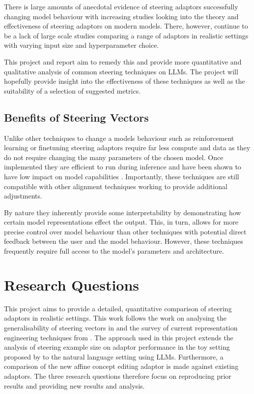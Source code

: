 There is large amounts of anecdotal evidence of steering adaptors successfully changing model behaviour with increasing studies looking into the theory \citep{steering-clear, steering-theory} and effectiveness \citep{steerability, steering-taxonomy} of steering adaptors on modern models.
There, however, continue to be a lack of large scale studies comparing a range of adaptors in realistic settings with varying input size and hyperparameter choice.

This project and report aim to remedy this and provide more quantitative and qualitative analysis of common steering techniques on LLMs.
The project will hopefully provide insight into the effectiveness of these techniques as well as the suitability of a selection of suggested metrics.

\subsection{Benefits of Steering Vectors}

Unlike other techniques to change a models behaviour such as reinforcement learning \citep{rl, rlhf} or finetuning \citep{lora} steering adaptors require far less compute and data as they do not require changing the many parameters of the chosen model.
Once implemented they are efficient to run during inference and have been shown to have low impact on model capabilities \citep{steering-wo-ss, sea}.
Importantly, these techniques are still compatible with other alignment techniques working to provide additional adjustments.

By nature they inherently provide some interpretability by demonstrating how certain model representations effect the output.
This, in turn, allows for more precise control over model behaviour than other techniques with potential direct feedback between the user and the model behaviour.
However, these techniques frequently require full access to the model's parameters and architecture.

\section{Research Questions}
\label{sec:questions}

This project aims to provide a detailed, quantitative comparison of steering adaptors in realistic settings.
This work follows the work on analysing the generalisability of steering vectors in \citet{steerability} and the survey of current representation engineering techniques from \citet{steering-taxonomy}.
The approach used in this project extends the analysis of steering example size on adaptor performance in the toy setting proposed by \citet{steering-clear} to the natural language setting using LLMs.
Furthermore, a comparison of the new affine concept editing \citep[ACE]{ace} adaptor is made against existing adaptors.
The three research questions therefore focus on reproducing prior results and providing new results and analysis.

